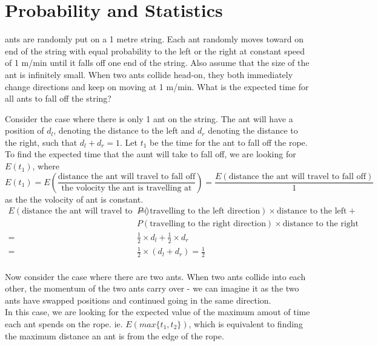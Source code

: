 \documentclass[answers]{exam}
\begin{document}
\section{Probability and Statistics}
\begin{questions}
    
 ants are randomly put on a 1 metre string. 
Each ant randomly moves toward on end of the string with equal 
probability to the left or the right at constant speed of 1 m/min 
until it falls off one end of the string. 
Also assume that the size of the ant is infinitely small. 
When two ants collide head-on, they both immediately change directions 
and keep on moving at 1 m/min. 
What is the expected time for all ants to fall off the string?

\begin{solution}
    Consider the case where there is only 1 ant on the string. The ant will 
have a position of $d_l$, denoting the distance to the left and $d_r$ denoting 
the distance to the right, such that $d_l+d_r = 1$.\newline 
Let $t_1$ be the time for the ant to fall off the rope. To find
 the expected time that the aunt will take to fall off, 
 we are
looking for $E(t_1)$, where
$$E(t_1) = E(\frac{\text{distance the ant will travel to fall off}}{\text{the volocity the ant is travelling at}})=\frac{E(\text{distance the ant will travel to fall off})}{1}$$
as the the volocity of ant is constant. 
\begin{align*}
    E(\text{distance the ant will travel to fall off})=&
    P(\text{travelling to the left direction})\times
    \text{distance to the left}+\\
    &P(\text{travelling to the right direction})\times
    \text{distance to the right}\\
    =&\frac{1}{2}\times d_l + \frac{1}{2} \times d_r\\
    =&\frac{1}{2}\times (d_l+d_r)
    =\frac{1}{2}
\end{align*}
\\
Now consider the case where there are two ants. When two ants collide into each other,
the momentum of the two ants carry over - we can imagine it as the two ants have swapped positions and
continued going in the same direction.\\
In this case, we are looking for the expected value of the maximum amout of time each ant spends on the rope.
ie. $E(max\{t_1, t_2\})$, which is equivalent to finding the maximum distance an ant is from the edge of the rope.\\

\end{solution}
\end{questions}
\end{document}

